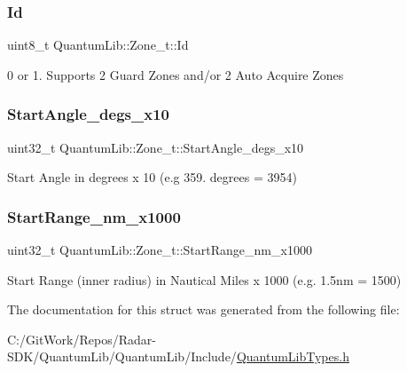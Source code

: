 \subsubsection{\texorpdfstring{Id}{Id}}
{\footnotesize\ttfamily uint8\+\_\+t Quantum\+Lib\+::\+Zone\+\_\+t\+::\+Id}



0 or 1. Supports 2 Guard Zones and/or 2 Auto Acquire Zones 

\mbox{\label{struct_quantum_lib_1_1_zone__t_aeee0428f3f061906525c2f694c2eff12}} 
\subsubsection{\texorpdfstring{Start\+Angle\+\_\+degs\+\_\+x10}{StartAngle\_degs\_x10}}
{\footnotesize\ttfamily uint32\+\_\+t Quantum\+Lib\+::\+Zone\+\_\+t\+::\+Start\+Angle\+\_\+degs\+\_\+x10}



Start Angle in degrees x 10 (e.\+g 359. degrees = 3954) 

\mbox{\label{struct_quantum_lib_1_1_zone__t_abbb3333cca9fe0ba588ff587dd28a66a}} 
\subsubsection{\texorpdfstring{Start\+Range\+\_\+nm\+\_\+x1000}{StartRange\_nm\_x1000}}
{\footnotesize\ttfamily uint32\+\_\+t Quantum\+Lib\+::\+Zone\+\_\+t\+::\+Start\+Range\+\_\+nm\+\_\+x1000}



Start Range (inner radius) in Nautical Miles x 1000 (e.\+g. 1.\+5nm = 1500) 



The documentation for this struct was generated from the following file\+:\begin{DoxyCompactItemize}
\item 
C\+:/\+Git\+Work/\+Repos/\+Radar-\/\+S\+D\+K/\+Quantum\+Lib/\+Quantum\+Lib/\+Include/\mbox{\hyperlink{_quantum_lib_types_8h}{Quantum\+Lib\+Types.\+h}}\end{DoxyCompactItemize}
